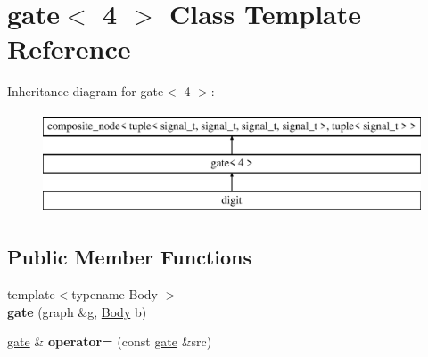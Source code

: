 \hypertarget{classgate_3_014_01_4}{}\section{gate$<$ 4 $>$ Class Template Reference}
\label{classgate_3_014_01_4}
Inheritance diagram for gate$<$ 4 $>$\+:\begin{figure}[H]
\begin{center}
\leavevmode
\includegraphics[height=3.000000cm]{classgate_3_014_01_4}
\end{center}
\end{figure}
\subsection*{Public Member Functions}
\begin{DoxyCompactItemize}
\item 
\hypertarget{classgate_3_014_01_4_a04f0c2166e39e502e9bf80319ebd073a}{}{\footnotesize template$<$typename Body $>$ }\\{\bfseries gate} (graph \&g, \hyperlink{classBody}{Body} b)\label{classgate_3_014_01_4_a04f0c2166e39e502e9bf80319ebd073a}

\item 
\hypertarget{classgate_3_014_01_4_a077544072d5390e838e6bab8f8273a5a}{}\hyperlink{classgate}{gate} \& {\bfseries operator=} (const \hyperlink{classgate}{gate} \&src)\label{classgate_3_014_01_4_a077544072d5390e838e6bab8f8273a5a}

\end{DoxyCompactItemize}
